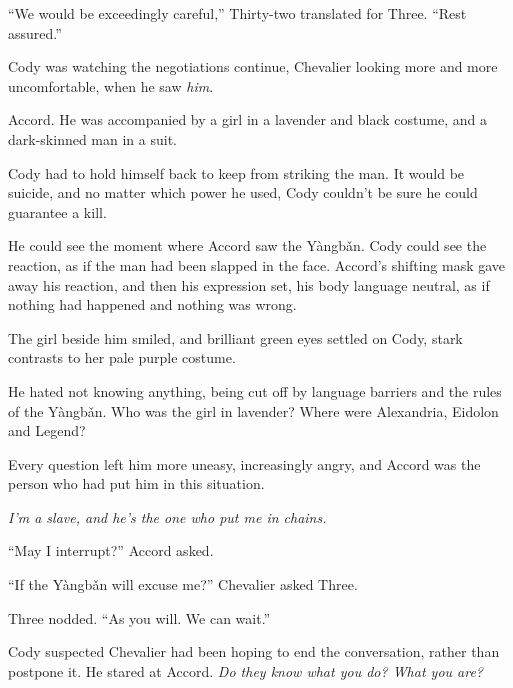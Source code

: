 ``We would be exceedingly careful,'' Thirty-two translated for Three.  ``Rest assured.''



Cody was watching the negotiations continue, Chevalier looking more and more uncomfortable, when he saw \emph{him}.



Accord.  He was accompanied by a girl in a lavender and black costume, and a dark-skinned man in a suit.



Cody had to hold himself back to keep from striking the man.  It would be suicide, and no matter which power he used, Cody couldn't be sure he could guarantee a kill.



He could see the moment where Accord saw the Y\`{a}ngb\v{a}n.  Cody could see the reaction, as if the man had been slapped in the face.  Accord's shifting mask gave away his reaction, and then his expression set, his body language neutral, as if nothing had happened and nothing was wrong.



The girl beside him smiled, and brilliant green eyes settled on Cody, stark contrasts to her pale purple costume.



He hated not knowing anything, being cut off by language barriers and the rules of the Y\`{a}ngb\v{a}n.  Who was the girl in lavender?  Where were Alexandria, Eidolon and Legend?



Every question left him more uneasy, increasingly angry, and Accord was the person who had put him in this situation.



\emph{I'm a slave, and he's the one who put me in chains.}



``May I interrupt?'' Accord asked.



``If the Y\`{a}ngb\v{a}n will excuse me?'' Chevalier asked Three.



Three nodded.  ``As you will.  We can wait.''



Cody suspected Chevalier had been hoping to end the conversation, rather than postpone it.  He stared at Accord.  \emph{Do they know what you do?  What you are?  }




